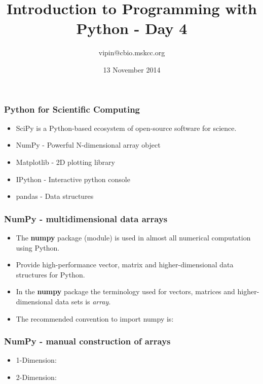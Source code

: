 \documentclass[11pt]{beamer}
\title[pyClass1]{Introduction to Programming with Python - Day 4}
\author{vipin@cbio.mskcc.org}
\institute[cBio@MSKCC]
{
    R{\"a}tsch Laboratory, Computational Biology Center\\
    Memorial Sloan Kettering Cancer Center\\
}
\date{13 November 2014}
\begin{document}
\maketitle
%
\begin{frame}[plain]
    \frametitle{Python for Scientific Computing}
    \begin{itemize}
        \item[] SciPy is a Python-based ecosystem of open-source software for science. 
        \newline 
        \item[] NumPy - Powerful N-dimensional array object 
        \newline
        \item[] Matplotlib - 2D plotting library
        \newline
        \item[] IPython - Interactive python console
        \newline
        \item[] pandas - Data structures
    \end{itemize}
\end{frame}
%
%
\begin{frame}[plain]
    \frametitle{NumPy - multidimensional data arrays}
    \begin{itemize}
        \item[] The \textbf{numpy} package (module) is used in almost all numerical computation using Python.
        \newline
        \item[] Provide high-performance vector, matrix and higher-dimensional data structures for Python.
        \newline
        \item[] In the \textbf{numpy} package the terminology used for vectors, matrices and higher-dimensional data sets is \textit{array}.
        \newline
         
         \item[] The recommended convention to import numpy is:
        \newline
         
    \end{itemize}
\end{frame}
%
\begin{frame}[plain]
    \frametitle{NumPy - manual construction of arrays}
    \begin{itemize}
        \item[] 1-Dimension: 
         
        \item[] 2-Dimension: 
         
    \end{itemize}
\end{frame}
\end{document}
